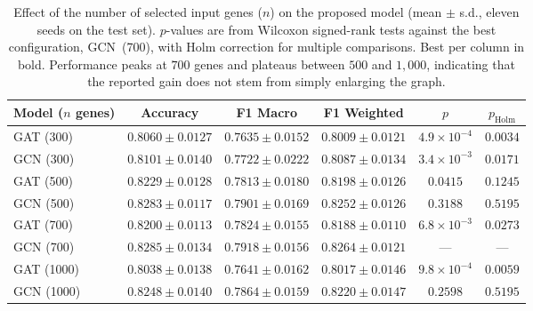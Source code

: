 \documentclass[11pt]{article}
\begin{document}
\clearpage

\begin{table}[t]
\centering
\caption{Effect of the number of selected input genes ($n$) on the
proposed model (mean $\pm$ s.d., eleven seeds on the test set).
$p$-values are from Wilcoxon signed-rank tests against the best
configuration, GCN~(700), with Holm correction for multiple
comparisons. Best per column in bold. Performance peaks at $700$ genes
and plateaus between $500$ and $1{,}000$, indicating that the reported
gain does not stem from simply enlarging the graph.}
\label{tab:ablation_genes}
\small
\setlength{\tabcolsep}{6pt}
\renewcommand{\arraystretch}{1.1}
\begin{tabular}{lccccc}
\toprule
\textbf{Model ($n$ genes)} & \textbf{Accuracy} & \textbf{F1 Macro} & \textbf{F1 Weighted} & \textbf{$p$} & \textbf{$p_{\text{Holm}}$} \\
\midrule
GAT (300)  & $0.8060 \pm 0.0127$ & $0.7635 \pm 0.0152$ & $0.8009 \pm 0.0121$ & $4.9\times10^{-4}$ & $0.0034$ \\
GCN (300)  & $0.8101 \pm 0.0140$ & $0.7722 \pm 0.0222$ & $0.8087 \pm 0.0134$ & $3.4\times10^{-3}$ & $0.0171$ \\
\midrule
GAT (500)  & $0.8229 \pm 0.0128$ & $0.7813 \pm 0.0180$ & $0.8198 \pm 0.0126$ & $0.0415$ & $0.1245$ \\
GCN (500)  & $0.8283 \pm 0.0117$ & $0.7901 \pm 0.0169$ & $0.8252 \pm 0.0126$ & $0.3188$ & $0.5195$ \\
\midrule
GAT (700)  & $0.8200 \pm 0.0113$ & $0.7824 \pm 0.0155$ & $0.8188 \pm 0.0110$ & $6.8\times10^{-3}$ & $0.0273$ \\
GCN (700)  & $\mathbf{0.8285 \pm 0.0134}$ & $\mathbf{0.7918 \pm 0.0156}$ & $\mathbf{0.8264 \pm 0.0121}$ & --- & --- \\
\midrule
GAT (1000) & $0.8038 \pm 0.0138$ & $0.7641 \pm 0.0162$ & $0.8017 \pm 0.0146$ & $9.8\times10^{-4}$ & $0.0059$ \\
GCN (1000) & $0.8248 \pm 0.0140$ & $0.7864 \pm 0.0159$ & $0.8220 \pm 0.0147$ & $0.2598$ & $0.5195$ \\
\bottomrule
\end{tabular}
\end{table}

\clearpage
\end{document}
